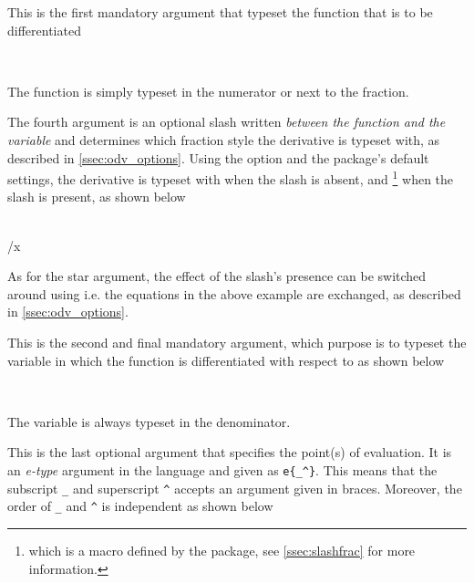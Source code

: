 \documentclass[final,british,10pt]{scrartcl}
\theoremstyle{remark}
\begin{document}
\begin{function}
		\begin{argument}{3}
			This is the first mandatory argument that typeset the function that is to be differentiated
			
			\begin{example}
				 \\
			\end{example}
			
			\noindent The function is simply typeset in the numerator or next to the fraction.
		\end{argument}
		
		\begin{argument}{4}
			The fourth argument is an optional slash written \emph{between the function and the variable} and determines which fraction style the derivative is typeset with, as described in \cref{ssec:odv_options}. Using the option  and the package's default settings, the derivative is typeset with  when the slash is absent, and \footnote{which is a macro defined by the package, see \cref{ssec:slashfrac} for more information.\label{foot:sfrac}} when the slash is present, as shown below
			
			\begin{example}
				\odv{y}{x} \\
				\odv{y}/{x}
			\end{example}
			
			\noindent As for the star argument, the effect of the slash's presence can be switched around using  i.e. the equations in the above example are exchanged, as described in \cref{ssec:odv_options}.
		\end{argument}
		
		\begin{argument}{5}
			This is the second and final mandatory argument, which purpose is to typeset the variable in which the function is differentiated with respect to as shown below
			
			\begin{example}
				\odv{f}{x} \\
				\odv{f}{y}
			\end{example}
			
			\noindent The variable is always typeset in the denominator.
		\end{argument}
		
		\begin{argument}{6}
			This is the last optional argument that specifies the point(s) of evaluation. It is an \emph{e-type} argument in the  language and given as \verb|e{_^}|. This means that the subscript \verb|_| and superscript \verb|^| accepts an argument given in braces. Moreover, the order of \verb|_| and \verb|^| is independent as shown below
			

\end{argument}
\end{function}
\end{document}
